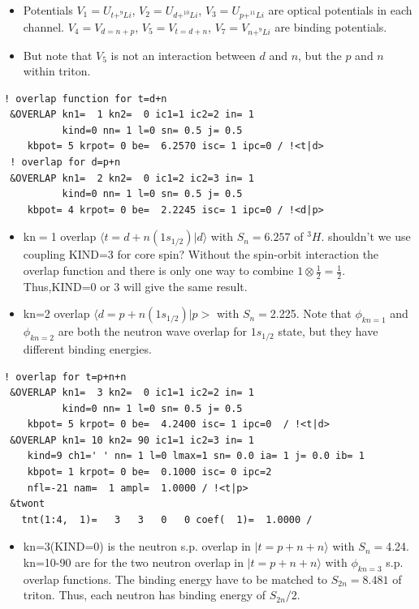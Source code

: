 \documentclass[11pt]{book}
\def\la{\langle}
\def\ra{\rangle}
\begin{document}
\begin{itemize}
\item Potentials $V_{1}=U_{t+^9Li}$, $V_2=U_{d+^{10}Li}$, $V_3=U_{p+^{11}Li}$
      are optical potentials in each channel. 
      $V_4=V_{d=n+p}$, $V_5=V_{t=d+n}$, $V_7=V_{n+^9Li}$ are 
      binding potentials.
\item But note that $V_5$ is not an interaction between 
      $d$ and $n$, but the $p$ and $n$ within triton. 
\end{itemize}


\begin{small} 
\begin{lstlisting}[frame=single] 
 ! overlap function for t=d+n
 &OVERLAP kn1=  1 kn2=  0 ic1=1 ic2=2 in= 1                                     
          kind=0 nn= 1 l=0 sn= 0.5 j= 0.5                                       
    kbpot= 5 krpot= 0 be=  6.2570 isc= 1 ipc=0 / !<t|d> 
 ! overlap for d=p+n   
 &OVERLAP kn1=  2 kn2=  0 ic1=2 ic2=3 in= 1                                     
          kind=0 nn= 1 l=0 sn= 0.5 j= 0.5                                       
    kbpot= 4 krpot= 0 be=  2.2245 isc= 1 ipc=0 / !<d|p> 
\end{lstlisting}
\begin{itemize}
\item kn$=$1 overlap $\la t=d+n(1s_{1/2})|d\ra $ 
      with $S_n=6.257$ of $^3H$. 
      {\color{blue} shouldn't we use coupling KIND=3 
       for core spin? Without the spin-orbit interaction the overlap function and there is only one way to combine $1\otimes\frac{1}{2}=\frac{1}{2}$.
       Thus,KIND=0 or 3 will give the same result.}   
\item kn=2 overlap $\la d=p+n(1s_{1/2})|p>$ with $S_n=$2.225.
      Note that $\phi_{kn=1}$ and $\phi_{kn=2}$ are both the neutron wave overlap for 
      $1s_{1/2}$ state, but they have different binding energies.
\end{itemize}
\begin{lstlisting}[frame=single] 
 ! overlap for t=p+n+n
 &OVERLAP kn1=  3 kn2=  0 ic1=1 ic2=2 in= 1                                     
          kind=0 nn= 1 l=0 sn= 0.5 j= 0.5                                       
    kbpot= 5 krpot= 0 be=  4.2400 isc= 1 ipc=0  / !<t|d> 
 &OVERLAP kn1= 10 kn2= 90 ic1=1 ic2=3 in= 1                                     
    kind=9 ch1=' ' nn= 1 l=0 lmax=1 sn= 0.0 ia= 1 j= 0.0 ib= 1                  
    kbpot= 1 krpot= 0 be=  0.1000 isc= 0 ipc=2 
    nfl=-21 nam=  1 ampl=  1.0000 / !<t|p> 
 &twont                                                                         
   tnt(1:4,  1)=   3   3   0   0 coef(  1)=  1.0000 /                 
\end{lstlisting}
\begin{itemize}
\item kn=3(KIND=0) is the neutron s.p. overlap in $|t=p+n+n\ra $ with $S_n=$4.24.
      kn=10-90 are for the two neutron overlap in  $|t=p+n+n\ra $
      with $\phi_{kn=3}$ s.p. overlap functions.
      The binding energy have to be
      matched to $S_{2n}=8.481 $ of triton. Thus, each neutron
      has binding energy of $S_{2n}/2$. 
            

\end{itemize}
\end{small}
\end{document}

